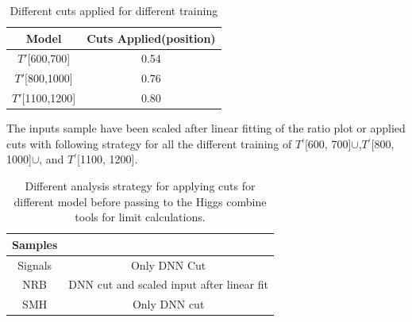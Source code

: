 \begin{table}[H]
    \centering
    \begin{tabular}{c|c} \hline
     Model &  Cuts Applied(position)\\\hline
      ${T'}$[600,700]   &  0.54\\
      $T'$[800,1000]   & 0.76 \\
      $T'$[1100,1200] & 0.80 \\\hline
    \end{tabular}
    \caption{Different cuts applied for different training}
    \label{tab:my_label_cuts}
\end{table}

The inputs sample have been scaled after linear fitting of the ratio plot or applied cuts with following strategy for all the different training of $T{^'}$[600, 700]$\cup$,$T{^'}$[800, 1000]$\cup$, and  $T{^'}$[1100, 1200]. 
\begin{table}[H]
    \centering
    \begin{tabular}{c|c}\hline
     Samples    &  \\\hline
     Signals    & Only DNN Cut \\
     NRB        & DNN cut and scaled input after linear fit \\
     SMH        & Only DNN cut \\\hline
    \end{tabular}
    \caption{Different analysis strategy for applying cuts for different model before passing to the Higgs combine tools for limit calculations.}
    \label{tab:my_label}
\end{table}






